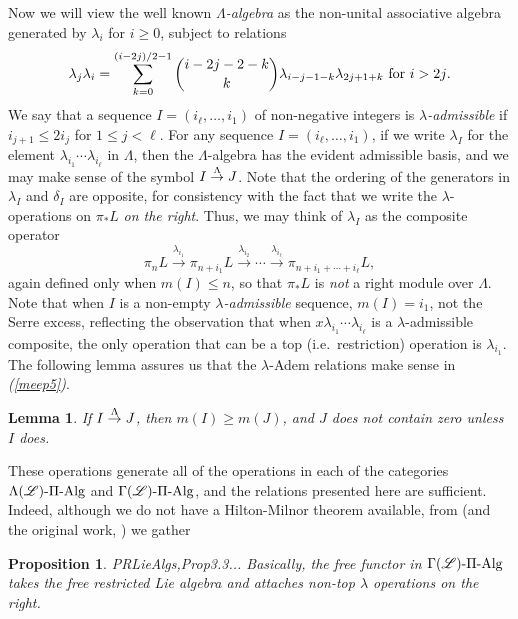 \documentclass[11pt]{amsart}
\theoremstyle{plain}
\newtheorem{lem}[thm]{Lemma}
\newtheorem{prop}[thm]{Proposition}
\theoremstyle{definition}
\renewcommand{\to}{\longrightarrow}
\newcommand{\scrL}{\mathscr{L}}
\theoremstyle{plain}
\newcommand{\LieOperad}{{\scrL}}
\newcommand{\PiAlg}{\textup{-$\Pi$-Alg}}
\newcommand{\minDimDelta}{m}
\newcommand{\produces}[3]{#3:#1\sim #2}
\renewcommand{\produces}[3]{#1\rightarrow_{#3} #2}%
\renewcommand{\produces}[3]{#1\overset{\smash{#3}}{\rightarrow} #2}%
\begin{document}
\begin{Constructing (co)homotopy operations}
Now we will view the well known \emph{$\Lambda$-algebra} as the non-unital associative algebra generated by $\lambda_i$ for $i\geq0$, subject to relations \[\lambda_j\lambda_i=\sum_{k=0}^{(i-2j)/2-1}{i-2j-2-k\choose k}\lambda_{i-j-1-k}\lambda_{2j+1+k}\textup{\ for $i>2j$.}\]
We say that a sequence $I=(i_\ell,\ldots,i_1)$ of non-negative integers is \emph{$\lambda$-admissible} if $i_{j+1}\leq 2i_j$ for $1\leq j <\ell$. 
For any sequence $I=(i_\ell,\ldots,i_1)$, if we write $\lambda_I$ for the element $\lambda_{i_1}\cdots \lambda_{i_\ell}$ in $\Lambda$, then the $\Lambda$-algebra has the evident admissible basis, and we may make sense of the symbol $\produces{I}{J}{\Lambda}$. Note that the ordering of the generators in $\lambda_I$ and $\delta_I$ are opposite, for consistency with the fact that we write the $\lambda$-operations on $\pi_*L$ \emph{on the right}. Thus, we may think of $\lambda_I$ as the composite operator  
\[\pi_{n}L\overset{\lambda_{i_1}}{\to}\pi_{n+i_1}L\overset{\lambda_{i_2}}{\to}\cdots \overset{\lambda_{i_\ell}}{\to}\pi_{n+i_1+\cdots +i_\ell}L,\]
again defined only when $\minDimDelta(I)\leq n$, so that $\pi_*L$ is \emph{not} a right module over $\Lambda$.
Note that when $I$ is a non-empty \emph{$\lambda$-admissible} sequence,
$\minDimDelta(I)=i_1$, not the Serre excess, reflecting the observation that when $x\lambda_{i_1}\cdots \lambda_{i_\ell}$ is a $\lambda$-admissible composite, the only operation that  can be a top (i.e.\ restriction) operation is $\lambda_{i_1}$.
The following lemma assures us that the $\lambda$-Adem relations make sense in \emph{(\ref{meep5})}.
\begin{lem}\label{lemOnAdemChangeInMLambdaPlain}
If $\produces{I}{J}{\Lambda}$, then $\minDimDelta(I)\geq\minDimDelta(J)$, and $J$ does not contain zero unless $I$ does.
\end{lem}
These operations generate all of the operations in each of the categories $\Lambda(\LieOperad)\PiAlg$ and $\Gamma(\LieOperad)\PiAlg$, and the relations presented here are sufficient. Indeed, although we do not have a Hilton-Milnor theorem available, from \cite[Theorem 8.8 and proof]{CurtisSimplicialHtpy.pdf} (and the original work, \cite{6Author.pdf}) we gather
\begin{prop}
{\textup{PRLieAlgs,Prop3.3}}... Basically, the free functor in $\Gamma(\LieOperad)\PiAlg$ takes the free restricted Lie algebra and attaches non-top $\lambda$ operations on the right.
\end{prop}


\end{Constructing (co)homotopy operations}
\end{document}
